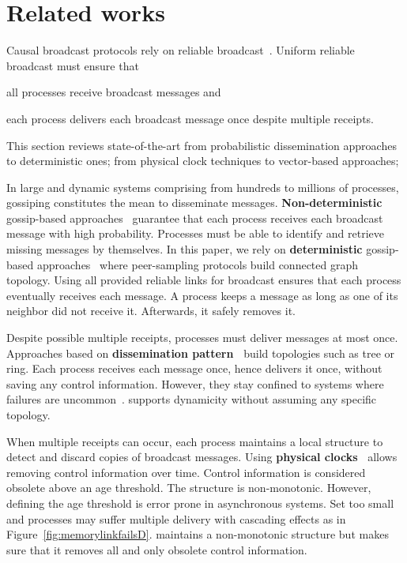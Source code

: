 
\section{Related works}
\label{sec:relatedwork}

Causal broadcast protocols rely on reliable
broadcast~\cite{hadzilacos1994modular}. Uniform reliable broadcast must ensure
that
\begin{inparaenum}[(i)]
\item all processes receive broadcast messages and
\item each process delivers each broadcast message once despite multiple
  receipts.
\end{inparaenum} This section reviews state-of-the-art from probabilistic
dissemination approaches to deterministic ones; from physical clock techniques
to vector-based approaches;

In large and dynamic systems comprising from hundreds to millions of processes,
gossiping constitutes the mean to disseminate
messages. \textbf{Non-deterministic} gossip-based
approaches~\cite{birman1999bimodal,demers1987epidemic} guarantee that each
process receives each broadcast message with high probability. Processes must be
able to identify and retrieve missing messages by themselves. In this paper, we
rely on \textbf{deterministic} gossip-based
approaches~\cite{friedman2004causal,nedelec2017adaptive} where peer-sampling
protocols build connected graph topology. Using all provided reliable links for
broadcast ensures that each process eventually receives each message. A process
keeps a message as long as one of its neighbor did not receive it. Afterwards,
it safely removes it.

Despite possible multiple receipts, processes must deliver messages at most
once. Approaches based on \textbf{dissemination
  pattern~\cite{bravo2017saturn,raynal2013distributed}} build topologies such as
tree or ring. Each process receives each message once, hence delivers it once,
without saving any control information. However, they stay confined to systems
where failures are uncommon~\cite{krasikova2016hashtable}. \RPCBROADCAST
supports dynamicity without assuming any specific topology. 

When multiple receipts can occur, each process maintains a local structure to
detect and discard copies of broadcast messages. Using \textbf{physical
  clocks~\cite{cachin2011introduction,demers1987epidemic}} allows removing
control information over time. Control information is considered obsolete above
an age threshold. The structure is non-monotonic. However, defining the age
threshold is error prone in asynchronous systems. Set too small and processes
may suffer multiple delivery with cascading effects as in
Figure~\ref{fig:memorylinkfailsD}.  \RPCBROADCAST maintains a non-monotonic
structure but makes sure that it removes all and only obsolete control
information.


